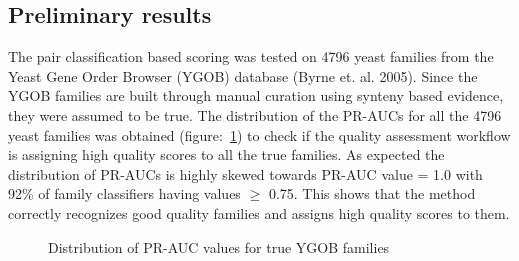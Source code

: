 \documentclass{article}
\begin{document}
		\subsection{Preliminary results}
		The pair classification based scoring was tested on 4796 yeast families from the Yeast Gene Order Browser (YGOB) database (Byrne et. al. 2005). Since the YGOB families are built through manual curation using synteny based evidence, they were assumed to be true. The distribution of the PR-AUCs for all the 4796 yeast families was obtained (figure:~\ref{fig:hist_pr-auc_true_ygob}) to check if the quality assessment workflow is assigning high quality scores to all the true families. As expected the distribution of PR-AUCs is highly skewed towards PR-AUC value = 1.0 with 92\% of family classifiers having values $\geq$ 0.75. This shows that the method correctly recognizes good quality families and assigns high quality scores to them.
		
		\begin{figure}
			\caption{Distribution of PR-AUC values for true YGOB families}
			\label{fig:hist_pr-auc_true_ygob}
		\end{figure}
		
\end{document}
